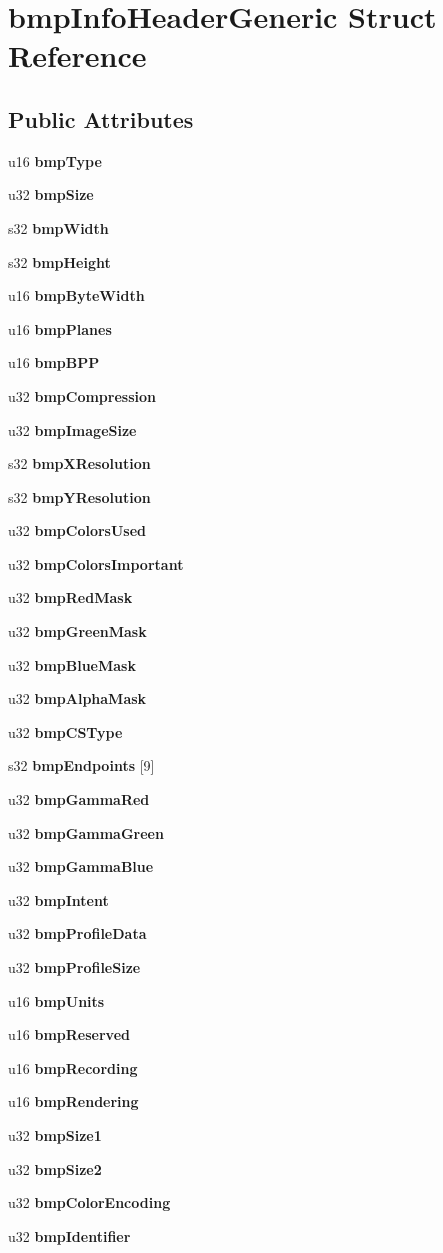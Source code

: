 \section{bmp\-Info\-Header\-Generic Struct Reference}
\label{structbmpInfoHeaderGeneric}
\subsection*{Public Attributes}
\begin{CompactItemize}
\item 
u16 {\bf bmp\-Type}
\item 
u32 {\bf bmp\-Size}
\item 
s32 {\bf bmp\-Width}
\item 
s32 {\bf bmp\-Height}
\item 
u16 {\bf bmp\-Byte\-Width}
\item 
u16 {\bf bmp\-Planes}
\item 
u16 {\bf bmp\-BPP}
\item 
u32 {\bf bmp\-Compression}
\item 
u32 {\bf bmp\-Image\-Size}
\item 
s32 {\bf bmp\-XResolution}
\item 
s32 {\bf bmp\-YResolution}
\item 
u32 {\bf bmp\-Colors\-Used}
\item 
u32 {\bf bmp\-Colors\-Important}
\item 
u32 {\bf bmp\-Red\-Mask}
\item 
u32 {\bf bmp\-Green\-Mask}
\item 
u32 {\bf bmp\-Blue\-Mask}
\item 
u32 {\bf bmp\-Alpha\-Mask}
\item 
u32 {\bf bmp\-CSType}
\item 
s32 {\bf bmp\-Endpoints} [9]
\item 
u32 {\bf bmp\-Gamma\-Red}
\item 
u32 {\bf bmp\-Gamma\-Green}
\item 
u32 {\bf bmp\-Gamma\-Blue}
\item 
u32 {\bf bmp\-Intent}
\item 
u32 {\bf bmp\-Profile\-Data}
\item 
u32 {\bf bmp\-Profile\-Size}
\item 
u16 {\bf bmp\-Units}
\item 
u16 {\bf bmp\-Reserved}
\item 
u16 {\bf bmp\-Recording}
\item 
u16 {\bf bmp\-Rendering}
\item 
u32 {\bf bmp\-Size1}
\item 
u32 {\bf bmp\-Size2}
\item 
u32 {\bf bmp\-Color\-Encoding}
\item 
u32 {\bf bmp\-Identifier}
\end{CompactItemize}


